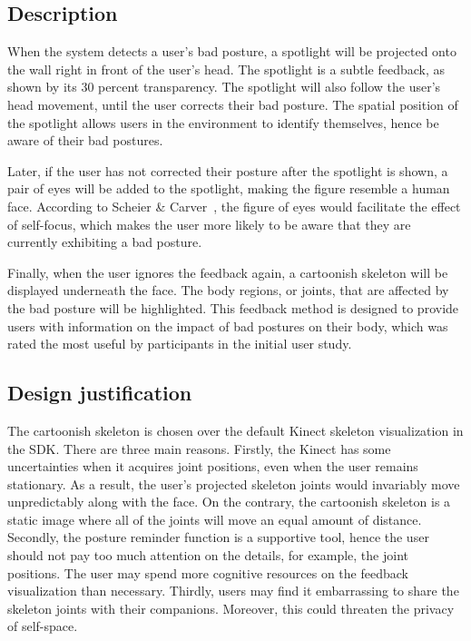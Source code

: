 \subsection{Description}
When the system detects a user's bad posture, a spotlight will be projected onto the wall right in front of the user's head. The spotlight is a subtle feedback, as shown by its 30 percent transparency. The spotlight will also follow the user's head movement, until the user corrects their bad posture. The spatial position of the spotlight allows users in the environment to identify themselves, hence be aware of their bad postures.

Later, if the user has not corrected their posture after the spotlight is shown, a pair of eyes will be added to the spotlight, making the figure resemble a human face. According to Scheier \& Carver~\cite{self_focus}, the figure of eyes would facilitate the effect of self-focus, which makes the user more likely to be aware that they are currently exhibiting a bad posture.

Finally, when the user ignores the feedback again, a cartoonish skeleton will be displayed underneath the face. The body regions, or joints, that are affected by the bad posture will be highlighted. This feedback method is designed to provide users with information on the impact of bad postures on their body, which was rated the most useful by participants in the initial user study.

\subsection{Design justification}

The cartoonish skeleton is chosen over the default Kinect skeleton visualization in the SDK. There are three main reasons. Firstly, the Kinect has some uncertainties when it acquires joint positions, even when the user remains stationary. As a result, the user's projected skeleton joints would invariably move unpredictably along with the face. On the contrary, the cartoonish skeleton is a static image where all of the joints will move an equal amount of distance. Secondly, the posture reminder function is a supportive tool, hence the user should not pay too much attention on the details, for example, the joint positions. The user may spend more cognitive resources on the feedback visualization than necessary. Thirdly, users may find it embarrassing to share the skeleton joints with their companions. Moreover, this could threaten the privacy of self-space.

